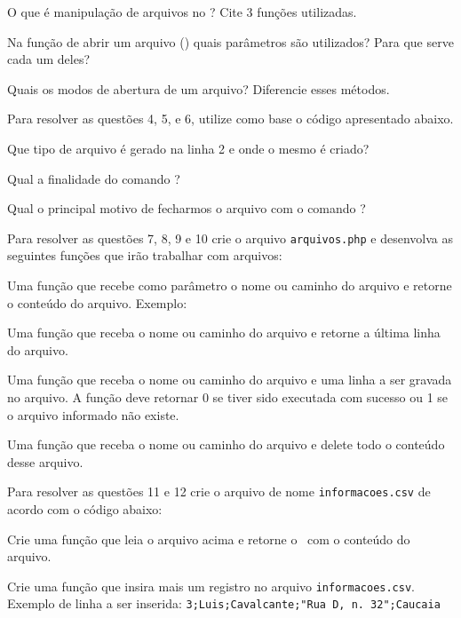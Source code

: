 \begin{description}[labelindent=30pt]
  \item [Q. 01] O que é manipulação de arquivos no \php? Cite 3 funções utilizadas.
  \item [Q. 02] Na função de abrir um arquivo (\funcaofopen) quais parâmetros são utilizados?
  Para que serve cada um deles?
  \item [Q. 03] Quais os modos de abertura de um arquivo? Diferencie esses métodos. 
  \item Para resolver as questões 4, 5, e 6, utilize como base o código apresentado
  abaixo. 
  
  \item [Q. 04] Que tipo de arquivo é gerado na linha 2 e onde o mesmo é criado?
  \item [Q. 05] Qual a finalidade do comando \funcaofwrite?
  \item [Q. 06] Qual o principal motivo de fecharmos o arquivo com o comando \funcaofclose?
  \item Para resolver as questões 7, 8, 9 e 10 crie o arquivo \texttt{arquivos.php} e desenvolva
  as seguintes funções que irão trabalhar com arquivos:
  \item [Q. 07] Uma função que recebe como parâmetro o nome ou caminho do arquivo e retorne o conteúdo 
  do arquivo. Exemplo:
  
  \item [Q. 08] Uma função que receba o nome ou caminho do arquivo e retorne a última linha do arquivo.
  
  \item [Q. 09] Uma função que receba o nome ou caminho do arquivo e uma linha a ser gravada no arquivo. 
  A função deve retornar 0 se tiver sido executada com sucesso ou 1 se o arquivo informado não existe.
  
  \item [Q. 10] Uma função que receba o nome ou caminho do arquivo e delete todo o conteúdo desse arquivo.
  
  \item Para resolver as questões 11 e 12 crie o arquivo de nome \texttt{informacoes.csv} de acordo com
  o código abaixo:
  
  \item [Q. 11] Crie uma função que leia o arquivo acima e retorne o \tipoarray~com o conteúdo do
  arquivo.
  \item [Q. 12] Crie uma função que insira mais um registro no arquivo \texttt{informacoes.csv}. Exemplo
  de linha a ser inserida: \texttt{3;Luis;Cavalcante;"Rua D, n. 32";Caucaia}


\end{description}

